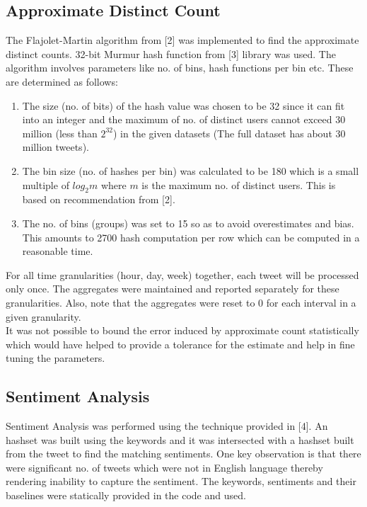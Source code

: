 \documentclass[11pt,a4paper,oneside]{article}
\begin{document}
	\subsection{Approximate Distinct Count}
	The Flajolet-Martin algorithm from [2] was implemented to find the approximate distinct counts. 32-bit Murmur hash function from [3] library was used. The algorithm involves parameters like no. of bins, hash functions per bin etc. These are determined as follows:
	\begin{enumerate}
		\item The size (no. of bits) of the hash value was chosen to be 32 since it can fit into an integer and the maximum of no. of distinct users cannot exceed 30 million (less than $2^{32}$) in the given datasets (The full dataset has about 30 million tweets).
		\item The bin size (no. of hashes per bin) was calculated to be 180 which is a small multiple of $log_2m$ where $m$ is the maximum no. of distinct users. This is based on recommendation from [2].
		\item The no. of bins (groups) was set to 15 so as to avoid overestimates and bias. This amounts to 2700 hash computation per row which can be computed in a reasonable time.
	\end{enumerate}


	For all time granularities (hour, day, week) together, each tweet will be processed only once. The aggregates were maintained and reported separately for these granularities. Also, note that the aggregates were reset to 0 for each interval in a given granularity. \\
		
	It was not possible to bound the error induced by approximate count statistically which would have helped to provide a tolerance for the estimate and help in fine tuning the parameters.
		
	\subsection{Sentiment Analysis}
	Sentiment Analysis was performed using the technique provided in [4]. An hashset was built using the keywords and it was intersected with a hashset built from the tweet to find the matching sentiments. One key observation is that there were significant no. of tweets which were not in English language thereby rendering inability to capture the sentiment. The keywords, sentiments and their baselines were statically provided in the code and used.
	     
\end{document}
